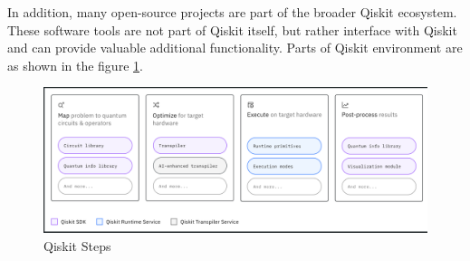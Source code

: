 \documentclass[12pt, oneside]{book}
\theoremstyle{definition}
\theoremstyle{definition}
\theoremstyle{remark}
\begin{document}
In addition, many open-source projects are part of the broader Qiskit ecosystem. These software tools are not part of Qiskit itself, but rather interface with Qiskit and can provide valuable additional functionality. Parts of Qiskit environment are as shown in the figure \ref{fig:Qiskit}.

\begin{figure}
    \centering
    \includegraphics[width=1\linewidth]{../images/Qiskit.png}
    \caption{Qiskit Steps}
    \label{fig:Qiskit}
\end{figure}
\end{document}
